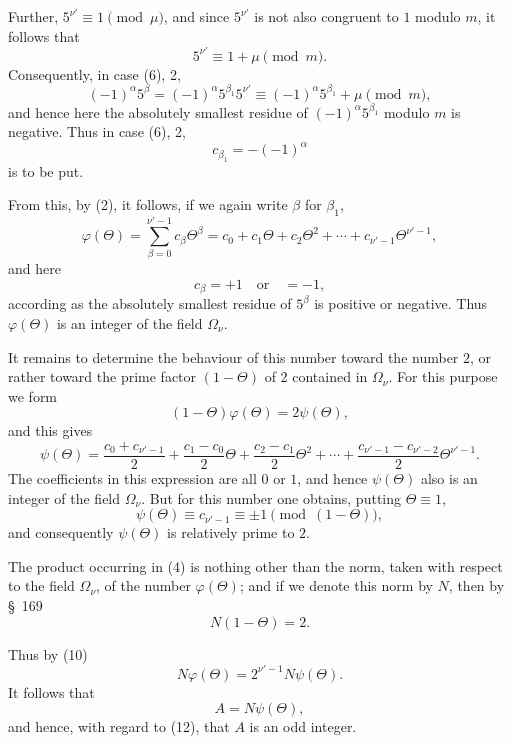 \documentclass[11pt]{article}
\begin{document}
Further, $5^{\nu'}\equiv1\pmod\mu$, and since $5^{\nu'}$ is not also congruent to $1$ modulo $m$, it follows that
\begin{equation}
5^{\nu'}\equiv1+\mu\pmod m.
\tag{7}
\end{equation}
Consequently, in case (6), 2,
\[
(-1)^\alpha5^\beta=(-1)^\alpha5^{\beta_1}5^{\nu'}\equiv(-1)^\alpha5^{\beta_1}+\mu\pmod m,
\]
and hence here the absolutely smallest residue of $(-1)^\alpha5^{\beta_1}$ modulo $m$ is negative. Thus in case (6), 2,
\[
c_{\beta_1}=-(-1)^\alpha
\]
is to be put.

From this, by (2), it follows, if we again write $\beta$ for $\beta_1$,
\begin{equation}
\varphi(\Theta)=\sum_{\beta=0}^{\nu'-1}c_\beta\Theta^\beta
=c_0+c_1\Theta+c_2\Theta^2+\cdots+c_{\nu'-1}\Theta^{\nu'-1},
\tag{8}
\end{equation}
and here
\begin{equation}
c_\beta=+1\quad\text{or}\quad=-1,
\tag{9}
\end{equation}
according as the absolutely smallest residue of $5^\beta$ is positive or negative. Thus $\varphi(\Theta)$ is an integer of the field $\Omega_\nu$.

It remains to determine the behaviour of this number toward the number $2$, or rather toward the prime factor $(1-\Theta)$ of $2$ contained in $\Omega_\nu$. For this purpose we form
\begin{equation}
(1-\Theta)\varphi(\Theta)=2\psi(\Theta),
\tag{10}
\end{equation}
and this gives
\begin{equation}
\psi(\Theta)=\frac{c_0+c_{\nu'-1}}{2}+\frac{c_1-c_0}{2}\Theta+\frac{c_2-c_1}{2}\Theta^2+\cdots+
\frac{c_{\nu'-1}-c_{\nu'-2}}{2}\Theta^{\nu'-1}.
\tag{11}
\end{equation}
The coefficients in this expression are all $0$ or $1$, and hence $\psi(\Theta)$ also is an integer of the field $\Omega_\nu$. But for this number one obtains, putting $\Theta\equiv1$,
\begin{equation}
\psi(\Theta)\equiv c_{\nu'-1}\equiv\pm1\pmod{(1-\Theta)},
\tag{12}
\end{equation}
and consequently $\psi(\Theta)$ is relatively prime to $2$.

The product occurring in (4) is nothing other than the norm, taken with respect to the field $\Omega_\nu$, of the number $\varphi(\Theta)$; and if we denote this norm by $N$, then by \S~169
\[
N(1-\Theta)=2.
\]

Thus by (10)
\[
N\varphi(\Theta)=2^{\nu'-1}N\psi(\Theta).
\]
It follows that
\begin{equation}
A=N\psi(\Theta),
\tag{13}
\end{equation}
and hence, with regard to (12), that $A$ is an odd integer.
\end{document}
